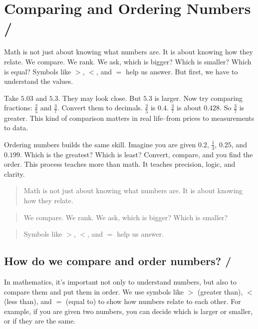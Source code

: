 \newpage
\section{Comparing and Ordering Numbers / }

Math is not just about knowing what numbers are. It is about knowing how they
relate. We compare. We rank. We ask, which is bigger? Which is smaller? Which is
equal? Symbols like \(>\), \(<\), and \(=\) help us answer. But first, we have to
understand the values.

Take \(5.03\) and \(5.3\). They may look close. But \(5.3\) is larger. Now try
comparing fractions: \(\frac{2}{5}\) and \(\frac{3}{7}\). Convert them to
decimals. \(\frac{2}{5}\) is \(0.4\). \(\frac{3}{7}\) is about \(0.428\). So
\(\frac{3}{7}\) is greater. This kind of comparison matters in real life--from
prices to measurements to data.

Ordering numbers builds the same skill. Imagine you are given \(0.2\),
\(\frac{1}{3}\), \(0.25\), and \(0.199\). Which is the greatest? Which is least?
Convert, compare, and you find the order. This process teaches more than math. It
teaches precision, logic, and clarity.

\blockquote{Math is not just about knowing what numbers are. It is about knowing
how they relate.}


\blockquote{We compare. We rank. We ask, which is bigger? Which is smaller?}


\blockquote{Symbols like \(>\), \(<\), and \(=\) help us answer.}


\subsection{How do we compare and order numbers? / }

In mathematics, it's important not only to understand numbers, but also to compare
them and put them in order. We use symbols like \(>\) (greater than), \(<\) (less
than), and \(=\) (equal to) to show how numbers relate to each other. For example,
if you are given two numbers, you can decide which is larger or smaller, or if
they are the same.

